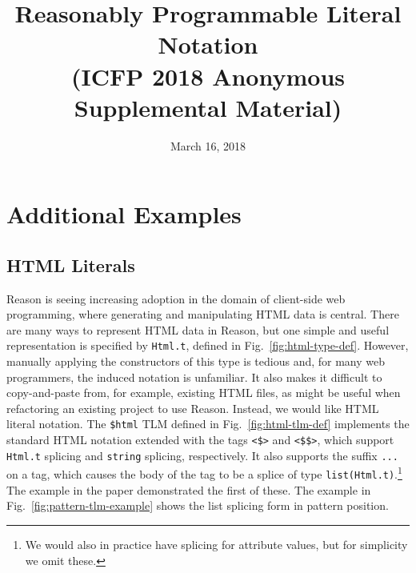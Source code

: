 \documentclass[12pt]{report}
\newcommand{\li}[1]{\lstinline[basicstyle=\ttfamily\fontsize{10pt}{1em}\selectfont]{#1}}
\begin{document}
 
\title{Reasonably Programmable Literal Notation\\ (ICFP 2018 Anonymous Supplemental Material)}
\date{March 16, 2018}
\maketitle
\tableofcontents
\appendix

\chapter{Additional Examples}




\section{HTML Literals} 
Reason is seeing increasing adoption in the domain of client-side web programming, where generating and manipulating HTML data is central. 
There are many ways to represent HTML data in Reason, but one simple and useful representation is specified by \li{Html.t}, defined in Fig.~\ref{fig:html-type-def}. However, manually applying the constructors of this type is tedious and, for many web programmers, the induced notation is unfamiliar. It also makes it difficult to copy-and-paste from, for example, existing HTML files, as might be useful when refactoring an existing project to use Reason. Instead, we would like HTML literal notation. 
The \li{$html} TLM defined in Fig.~\ref{fig:html-tlm-def} implements the standard HTML notation extended with the tags \li{<$>} and \li{<$$>}, which support \li{Html.t} splicing and \li{string} splicing, respectively. It also supports the suffix \li{...} on a tag, which causes the body of the tag to be a splice of type \li{list(Html.t)}.\footnote{We would also in practice have splicing for  attribute values, but for simplicity we omit these.} The example in the paper demonstrated the first of these. The example in Fig.~\ref{fig:pattern-tlm-example} shows the list splicing form in pattern position.%
\end{document}
